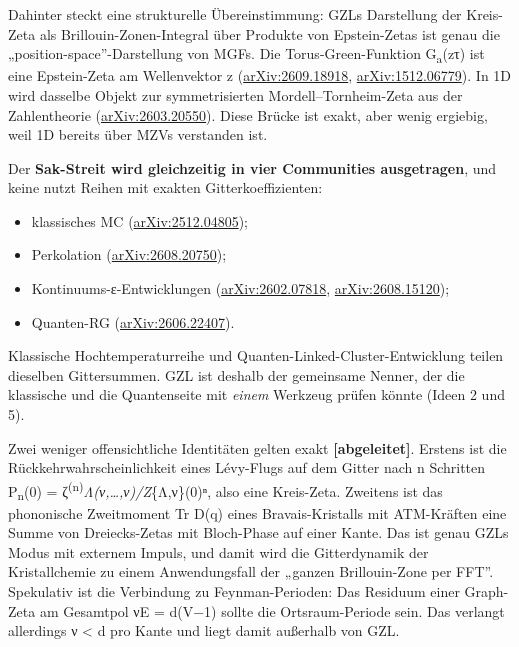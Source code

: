 Dahinter steckt eine strukturelle Übereinstimmung: GZLs Darstellung der Kreis-Zeta als Brillouin-Zonen-Integral über Produkte von Epstein-Zetas ist genau die „position-space''-Darstellung von MGFs. Die Torus-Green-Funktion G\textsubscript{a}(z\textbar τ) ist eine Epstein-Zeta am Wellenvektor z (\href{https://arxiv.org/abs/2609.18918}{arXiv:2609.18918}, \href{https://arxiv.org/abs/1512.06779}{arXiv:1512.06779}). In 1D wird dasselbe Objekt zur symmetrisierten Mordell--Tornheim-Zeta aus der Zahlentheorie (\href{https://arxiv.org/abs/2603.20550}{arXiv:2603.20550}). Diese Brücke ist exakt, aber wenig ergiebig, weil 1D bereits über MZVs verstanden ist.

Der \textbf{Sak-Streit wird gleichzeitig in vier Communities ausgetragen}, und keine nutzt Reihen mit exakten Gitterkoeffizienten:

\begin{itemize}
\tightlist
\item
  klassisches MC (\href{https://arxiv.org/abs/2512.04805}{arXiv:2512.04805});
\item
  Perkolation (\href{https://arxiv.org/abs/2608.20750}{arXiv:2608.20750});
\item
  Kontinuums-ε-Entwicklungen (\href{https://arxiv.org/abs/2602.07818}{arXiv:2602.07818}, \href{https://arxiv.org/abs/2608.15120}{arXiv:2608.15120});
\item
  Quanten-RG (\href{https://arxiv.org/abs/2606.22407}{arXiv:2606.22407}).
\end{itemize}

Klassische Hochtemperaturreihe und Quanten-Linked-Cluster-Entwicklung teilen dieselben Gittersummen. GZL ist deshalb der gemeinsame Nenner, der die klassische und die Quantenseite mit \emph{einem} Werkzeug prüfen könnte (Ideen 2 und 5).

Zwei weniger offensichtliche Identitäten gelten exakt \textbf{{[}abgeleitet{]}}. Erstens ist die Rückkehrwahrscheinlichkeit eines Lévy-Flugs auf dem Gitter nach n Schritten P\textsubscript{n}(0) = ζ\textsuperscript{(n)}\emph{Λ(ν,\ldots,ν)/Z}\{Λ,ν\}(0)ⁿ, also eine Kreis-Zeta. Zweitens ist das phononische Zweitmoment Tr D(q) eines Bravais-Kristalls mit ATM-Kräften eine Summe von Dreiecks-Zetas mit Bloch-Phase auf einer Kante. Das ist genau GZLs Modus mit externem Impuls, und damit wird die Gitterdynamik der Kristallchemie zu einem Anwendungsfall der „ganzen Brillouin-Zone per FFT''. Spekulativ ist die Verbindung zu Feynman-Perioden: Das Residuum einer Graph-Zeta am Gesamtpol ν\textbar E\textbar{} = d(\textbar V\textbar−1) sollte die Ortsraum-Periode sein. Das verlangt allerdings ν \textless{} d pro Kante und liegt damit außerhalb von GZL.

